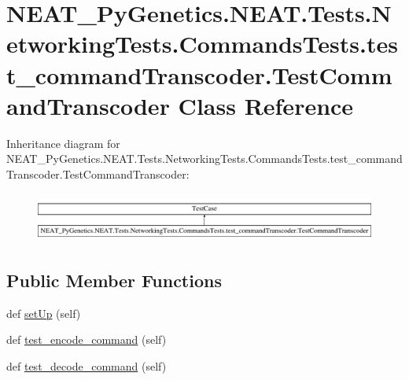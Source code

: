 \hypertarget{classNEAT__PyGenetics_1_1NEAT_1_1Tests_1_1NetworkingTests_1_1CommandsTests_1_1test__commandTranscoder_1_1TestCommandTranscoder}{}\section{N\+E\+A\+T\+\_\+\+Py\+Genetics.\+N\+E\+A\+T.\+Tests.\+Networking\+Tests.\+Commands\+Tests.\+test\+\_\+command\+Transcoder.\+Test\+Command\+Transcoder Class Reference}
\label{classNEAT__PyGenetics_1_1NEAT_1_1Tests_1_1NetworkingTests_1_1CommandsTests_1_1test__commandTranscoder_1_1TestCommandTranscoder}
Inheritance diagram for N\+E\+A\+T\+\_\+\+Py\+Genetics.\+N\+E\+A\+T.\+Tests.\+Networking\+Tests.\+Commands\+Tests.\+test\+\_\+command\+Transcoder.\+Test\+Command\+Transcoder\+:\begin{figure}[H]
\begin{center}
\leavevmode
\includegraphics[height=1.649485cm]{classNEAT__PyGenetics_1_1NEAT_1_1Tests_1_1NetworkingTests_1_1CommandsTests_1_1test__commandTranscoder_1_1TestCommandTranscoder}
\end{center}
\end{figure}
\subsection*{Public Member Functions}
\begin{DoxyCompactItemize}
\item 
def \hyperlink{classNEAT__PyGenetics_1_1NEAT_1_1Tests_1_1NetworkingTests_1_1CommandsTests_1_1test__commandTranscoder_1_1TestCommandTranscoder_a2272af4f270fe071e01f4f958ae98f0c}{set\+Up} (self)
\item 
def \hyperlink{classNEAT__PyGenetics_1_1NEAT_1_1Tests_1_1NetworkingTests_1_1CommandsTests_1_1test__commandTranscoder_1_1TestCommandTranscoder_aa76781012dfd0b9e6c121d9d17c2167e}{test\+\_\+encode\+\_\+command} (self)
\item 
def \hyperlink{classNEAT__PyGenetics_1_1NEAT_1_1Tests_1_1NetworkingTests_1_1CommandsTests_1_1test__commandTranscoder_1_1TestCommandTranscoder_a64882d2ce98604b07d52cea3c2c71f7c}{test\+\_\+decode\+\_\+command} (self)
\end{DoxyCompactItemize}
